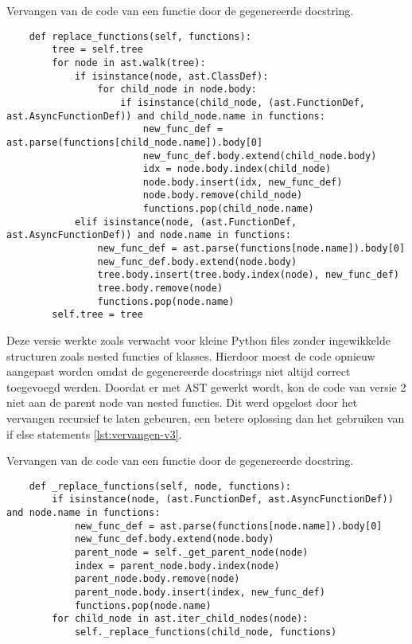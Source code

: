 \begin{listing}
    \caption{Vervangen van de code van een functie door de gegenereerde docstring.}
    \label{lst:vervangen-v2}
    \begin{verbatim}
    def replace_functions(self, functions):
        tree = self.tree
        for node in ast.walk(tree):
            if isinstance(node, ast.ClassDef):
                for child_node in node.body:
                    if isinstance(child_node, (ast.FunctionDef, ast.AsyncFunctionDef)) and child_node.name in functions:
                        new_func_def = ast.parse(functions[child_node.name]).body[0]
                        new_func_def.body.extend(child_node.body)
                        idx = node.body.index(child_node)
                        node.body.insert(idx, new_func_def)
                        node.body.remove(child_node)
                        functions.pop(child_node.name)
            elif isinstance(node, (ast.FunctionDef, ast.AsyncFunctionDef)) and node.name in functions:
                new_func_def = ast.parse(functions[node.name]).body[0]
                new_func_def.body.extend(node.body)
                tree.body.insert(tree.body.index(node), new_func_def)
                tree.body.remove(node)
                functions.pop(node.name)
        self.tree = tree
    \end{verbatim}
\end{listing}

Deze versie werkte zoals verwacht voor kleine Python files zonder ingewikkelde structuren zoals nested functies of klasses.
Hierdoor moest de code opnieuw aangepast worden omdat de gegenereerde docstrings niet altijd correct toegevoegd werden.
Doordat er met AST gewerkt wordt, kon de code van versie 2 niet aan de parent node van nested functies.
Dit werd opgelost door het vervangen recursief te laten gebeuren, een betere oplossing dan het gebruiken van if else statements \ref{lst:vervangen-v3}.

\begin{listing}
    \caption{Vervangen van de code van een functie door de gegenereerde docstring.}
    \label{lst:vervangen-v3}
    \begin{verbatim}
    def _replace_functions(self, node, functions):
        if isinstance(node, (ast.FunctionDef, ast.AsyncFunctionDef)) and node.name in functions:
            new_func_def = ast.parse(functions[node.name]).body[0]
            new_func_def.body.extend(node.body)
            parent_node = self._get_parent_node(node)
            index = parent_node.body.index(node)
            parent_node.body.remove(node)
            parent_node.body.insert(index, new_func_def)
            functions.pop(node.name)
        for child_node in ast.iter_child_nodes(node):
            self._replace_functions(child_node, functions)
    \end{verbatim}
\end{listing}

